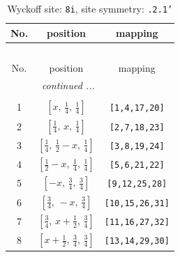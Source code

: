 \documentclass[fleqn,8pt]{jsarticle}
\begin{document}
\begin{longtable}{ccc}
\caption{Wyckoff site: {\tt 8i}, site symmetry: {\tt .2.1'}}
 \\
 \hline \hline
No. & position & mapping \\ \hline \endfirsthead

\multicolumn{2}{l}{\tablename\ \thetable{}} \\
 \hline \hline
No. & position & mapping \\ \hline \endhead

 \hline \hline
\multicolumn{2}{r}{\footnotesize\it continued ...} \\ \endfoot

 \hline \hline
\multicolumn{2}{r}{} \\ \endlastfoot

1 & $\left[ x,\, \frac{1}{4},\, \frac{1}{4} \right]$ & {\tt [1,4,17,20]} \\ \hline
2 & $\left[ \frac{1}{4},\, x,\, \frac{1}{4} \right]$ & {\tt [2,7,18,23]} \\ \hline
3 & $\left[ \frac{1}{4},\, \frac{1}{2} - x,\, \frac{1}{4} \right]$ & {\tt [3,8,19,24]} \\ \hline
4 & $\left[ \frac{1}{2} - x,\, \frac{1}{4},\, \frac{1}{4} \right]$ & {\tt [5,6,21,22]} \\ \hline
5 & $\left[ - x,\, \frac{3}{4},\, \frac{3}{4} \right]$ & {\tt [9,12,25,28]} \\ \hline
6 & $\left[ \frac{3}{4},\, - x,\, \frac{3}{4} \right]$ & {\tt [10,15,26,31]} \\ \hline
7 & $\left[ \frac{3}{4},\, x + \frac{1}{2},\, \frac{3}{4} \right]$ & {\tt [11,16,27,32]} \\ \hline
8 & $\left[ x + \frac{1}{2},\, \frac{3}{4},\, \frac{3}{4} \right]$ & {\tt [13,14,29,30]} \\
\end{longtable}
\renewcommand{\arraystretch}{1.2}
\end{document}
